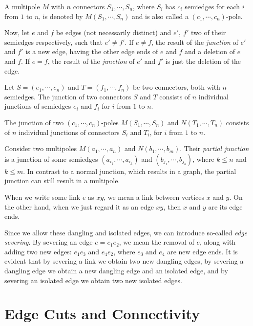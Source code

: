 \documentclass[12pt, twoside]{book}
\begin{document}
A multipole $M$ with $n$ connectors $S_1,\cdots,S_n$, where $S_i$ has $c_i$ semiedges for each $i$ from $1$ to $n$, is denoted by $M(S_1,\cdots,S_n)$ and is also called a $(c_1,\cdots,c_n)$-pole.

Now, let $e$ and $f$ be edges (not necessarily distinct) and $e',~f'$ two of their semiedges respectively, such that $e'\neq f'$. If $e\neq f$, the result of the \textit{junction} of $e'$ and $f'$ is a new edge, having the other edge ends of $e$ and $f$ and a deletion of $e$ and $f$. If $e=f$, the result of the \textit{junction} of $e'$ and $f'$ is just the deletion of the edge.

Let $S=(e_1,\cdots,e_n)$ and $T=(f_1,\cdots,f_n)$ be two connectors, both with $n$ semiedges. The junction of two connectors $S$ and $T$ consists of $n$ individual junctions of semiedges $e_i$ and $f_i$ for $i$ from $1$ to $n$.

The junction of two $(c_1,\cdots,c_n)$-poles $M(S_1,\cdots,S_n)$ and $N(T_1,\cdots,T_n)$ consists of $n$ individual junctions of connectors $S_i$ and $T_i$, for $i$ from $1$ to $n$.

Consider two multipoles $M(a_1,\cdots,a_n)$ and $N(b_1,\cdots,b_m)$. Their \textit{partial junction} is a junction of some semiedges $(a_{i_1},\cdots, a_{i_k})$ and $(b_{j_1},\cdots, b_{j_k})$, where $k\leq n$ and $k\leq m$. In contrast to a normal junction, which results in a graph, the partial junction can still result in a multipole.


When we write some link $e$ as $xy$, we mean a link between vertices $x$ and $y$. On the other hand, when we just regard it as an edge $xy$, then $x$ and $y$ are its edge ends.

Since we allow these dangling and isolated edges, we can introduce so-called \textit{edge severing}. By severing an edge $e=e_1e_2$, we mean the removal of $e$, along with adding two new edges: $e_1e_3$ and $e_4e_2$, where $e_3$ and $e_4$ are new edge ends. It is evident that by severing a link we obtain two new dangling edges, by severing a dangling edge we obtain a new dangling edge and an isolated edge, and by severing an isolated edge we obtain two new isolated edges.

\section{Edge Cuts and Connectivity}\label{sec:edge-cuts}
\end{document}
